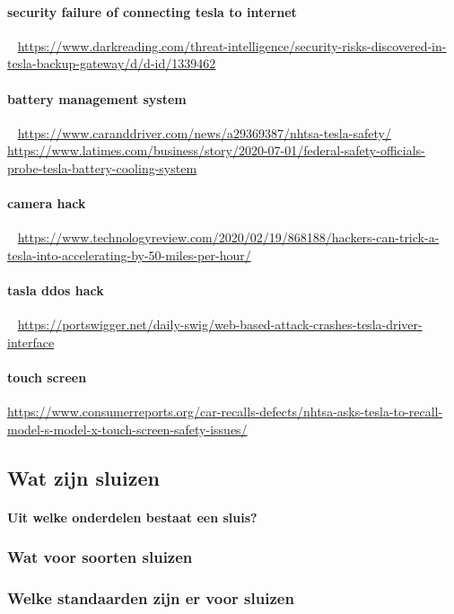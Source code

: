 \documentclass{article}
\begin{document}
\paragraph{security failure of connecting tesla to internet}
~\cite{secgateway}
\url{https://www.darkreading.com/threat-intelligence/security-risks-discovered-in-tesla-backup-gateway/d/d-id/1339462}
\paragraph{battery management system}
~\cite{caranddriver}
\url{https://www.caranddriver.com/news/a29369387/nhtsa-tesla-safety/}
~\cite{teslacooling}
\url{https://www.latimes.com/business/story/2020-07-01/federal-safety-officials-probe-tesla-battery-cooling-system}
\paragraph{camera hack}
~\cite{trickteslaaccel}
\url{https://www.technologyreview.com/2020/02/19/868188/hackers-can-trick-a-tesla-into-accelerating-by-50-miles-per-hour/}
\paragraph{tasla ddos hack}
~\cite{portswigger}
\url{https://portswigger.net/daily-swig/web-based-attack-crashes-tesla-driver-interface}

\paragraph{touch screen}
\url{https://www.consumerreports.org/car-recalls-defects/nhtsa-asks-tesla-to-recall-model-s-model-x-touch-screen-safety-issues/}

\subsection{Wat zijn sluizen}

\paragraph{Uit welke onderdelen bestaat een sluis?}

\subsubsection{Wat voor soorten sluizen}
\subsubsection{Welke standaarden zijn er voor sluizen}
\end{document}
